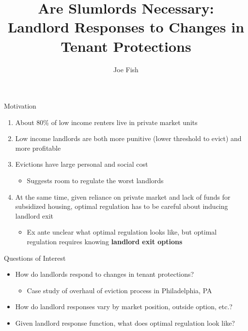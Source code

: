 \documentclass[10pt, xcolor=dvipsnames]{beamer}
\date{}
\title[Landlord Responses to Changes in Tenant Protections]{Are Slumlords Necessary: \\Landlord Responses to Changes in Tenant Protections} %
\author[Joe Fish]{Joe Fish}
\begin{document}
\begin{frame}
\titlepage %
\end{frame}

\begin{frame}{Motivation}
    \begin{enumerate}
        \item About 80\% of low income renters live in private market units \parencite{jchs_2024, nhpd2024profiles}
        \pause
        \item Low income landlords are both more punitive (lower threshold to evict) and more profitable \parencite{Desmond_2019, Eisfeldt_2015,Damen_2025}
        \item Evictions have large personal and social cost \parencite{desmond-evicted,humphries2025, collison-et-al-2023}
        \begin{itemize}
            \item Suggests room to regulate the worst landlords
        \end{itemize}
        \pause
        \item At the same time, given reliance on private market and lack of funds for subsidized housing, optimal regulation has to be careful about inducing landlord exit
        \begin{itemize}
            \item Ex ante unclear what optimal regulation looks like, but optimal regulation requires knowing \textbf{landlord exit options}
        \end{itemize}
    \end{enumerate}

\end{frame}


\begin{frame}{Questions of Interest}
    \begin{itemize}
        \item How do landlords respond to changes in tenant protections?
        \begin{itemize}
           \item Case study of overhaul of eviction process in Philadelphia, PA
        \end{itemize}
         \item How do landlord responses vary by market position, outside option, etc.?
         \item Given landlord response function, what does optimal regulation look like?
    \end{itemize}
\end{frame}
\end{document}
